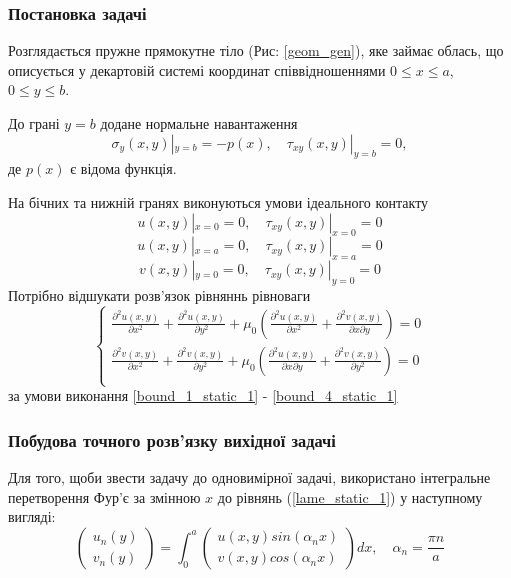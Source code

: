 \subsubsection{Постановка задачі}
Розглядається пружне прямокутне тіло (Рис: \ref{geom_gen}), яке займає облась,
що описується у декартовій системі координат співвідношеннями $0 \le x \le a$, $0 \le y \le b$.

До грані $y=b$ додане нормальне навантаження
\begin{equation}\label{bound_1_static_1}
    \sigma_y(x, y) |_{y=b} = -p(x), \quad  \tau_{xy}(x,y) |_{y=b} =0,
\end{equation}
де $p(x)$ є відома функція.

На бічних та нижній гранях виконуються умови ідеального контакту
\begin{equation}\label{bound_2_static_1}
    u(x,y) |_{x=0} = 0, \quad \tau_{xy}(x,y) |_{x=0} =0
\end{equation}
\begin{equation}\label{bound_3_static_1}
    u(x,y) |_{x=a} = 0, \quad \tau_{xy}(x,y) |_{x=a} =0
\end{equation}
\begin{equation}\label{bound_4_static_1}
    v(x,y) |_{y=0} = 0, \quad \tau_{xy}(x,y) |_{y=0} =0
\end{equation}
Потрібно відшукати розв'язок рівняннь рівноваги
\begin{equation}\label{lame_static_1}
    \begin{cases}
        \frac{\partial^2 u(x,y)}{\partial x^2} + \frac{\partial^2 u(x,y)}{\partial y^2} + \mu_0 (\frac{\partial^2 u(x,y)}{\partial x^2} + \frac{\partial^2 v(x,y)}{\partial x\partial y}) = 0 \\
        \frac{\partial^2 v(x,y)}{\partial x^2} + \frac{\partial^2 v(x,y)}{\partial y^2} + \mu_0 (\frac{\partial^2 u(x,y)}{\partial x \partial y} + \frac{\partial^2 v(x,y)}{\partial y^2}) = 0 \\
    \end{cases}
\end{equation}
за умови виконання \eqref{bound_1_static_1} - \eqref{bound_4_static_1}

\subsubsection{Побудова точного розв'язку вихідної задачі}
Для того, щоби звести задачу до одновимірної задачі, використано інтегральне перетворення Фур'є за змінною $x$ до рівнянь (\ref{lame_static_1}) у наступному вигляді:
\begin{equation}
    \begin{pmatrix}
        u_n(y) \\
        v_n(y)
    \end{pmatrix} = \int_{0}^{a} 
    \begin{pmatrix}
        u(x,y) sin(\alpha_n x) \\
        v(x,y) cos(\alpha_n x)
    \end{pmatrix} dx, \quad \alpha_n = \frac{\pi n}{a}
\end{equation}

